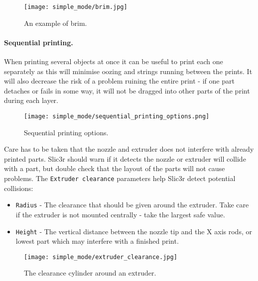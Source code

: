 \begin{figure}[H]
\centering
\texttt{[image: simple\_mode/brim.jpg]}
\caption{An example of brim.}
\label{fig:an_example_of_brim}
\end{figure}


\paragraph{Sequential printing.} %
\label{par:simple_sequential_printing}
When printing several objects at once it can be useful to print each one separately as this will minimise oozing and strings running between the prints.  It will also decrease the risk of a problem ruining the entire print - if one part detaches or fails in some way, it will not be dragged into other parts of the print during each layer.

\begin{figure}[H]
\centering
\texttt{[image: simple\_mode/sequential\_printing\_options.png]}
\caption{Sequential printing options.}
\label{fig:sequential_printing_options}
\end{figure}

Care has to be taken that the nozzle and extruder does not interfere with already printed parts.  Slic3r should warn if it detects the nozzle or extruder will collide with a part, but double check that the layout of the parts will not cause problems.  The \texttt{Extruder clearance} parameters help Slic3r detect potential collisions:
\begin{itemize}
	\item \texttt{Radius}  - The clearance that should be given around the extruder.  Take care if the extruder is not mounted centrally - take the largest safe value.
	\item \texttt{Height}  - The vertical distance between the nozzle tip and the X axis rods, or lowest part which may interfere with a finished print.
\end{itemize}

\begin{figure}[H]
\centering
\texttt{[image: simple\_mode/extruder\_clearance.jpg]}
\caption{The clearance cylinder around an extruder.}
\label{fig:a_diagram_depicting_extruder_clearance}
\end{figure}


